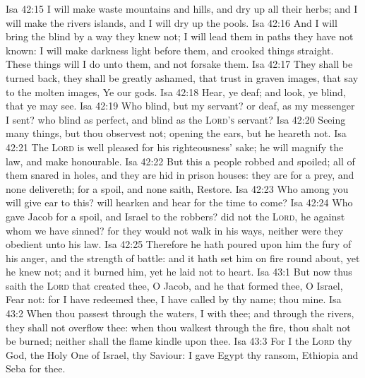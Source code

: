 \vs Isa 42:15 I will make waste mountains and hills, and dry up all their herbs; and I will make the rivers islands, and I will dry up the pools.
\vs Isa 42:16 And I will bring the blind by a way  they knew not; I will lead them in paths  they have not known: I will make darkness light before them, and crooked things straight. These things will I do unto them, and not forsake them.
\vs Isa 42:17 They shall be turned back, they shall be greatly ashamed, that trust in graven images, that say to the molten images, Ye  our gods.
\vs Isa 42:18 Hear, ye deaf; and look, ye blind, that ye may see.
\vs Isa 42:19 Who  blind, but my servant? or deaf, as my messenger  I sent? who  blind as  perfect, and blind as the \textsc{Lord's} servant?
\vs Isa 42:20 Seeing many things, but thou observest not; opening the ears, but he heareth not.
\vs Isa 42:21 The \textsc{Lord} is well pleased for his righteousness' sake; he will magnify the law, and make  honourable.
\vs Isa 42:22 But this  a people robbed and spoiled;  all of them snared in holes, and they are hid in prison houses: they are for a prey, and none delivereth; for a spoil, and none saith, Restore.
\vs Isa 42:23 Who among you will give ear to this?  will hearken and hear for the time to come?
\vs Isa 42:24 Who gave Jacob for a spoil, and Israel to the robbers? did not the \textsc{Lord}, he against whom we have sinned? for they would not walk in his ways, neither were they obedient unto his law.
\vs Isa 42:25 Therefore he hath poured upon him the fury of his anger, and the strength of battle: and it hath set him on fire round about, yet he knew not; and it burned him, yet he laid  not to heart.
\vs Isa 43:1 But now thus saith the \textsc{Lord} that created thee, O Jacob, and he that formed thee, O Israel, Fear not: for I have redeemed thee, I have called  by thy name; thou  mine.
\vs Isa 43:2 When thou passest through the waters, I  with thee; and through the rivers, they shall not overflow thee: when thou walkest through the fire, thou shalt not be burned; neither shall the flame kindle upon thee.
\vs Isa 43:3 For I  the \textsc{Lord} thy God, the Holy One of Israel, thy Saviour: I gave Egypt  thy ransom, Ethiopia and Seba for thee.
